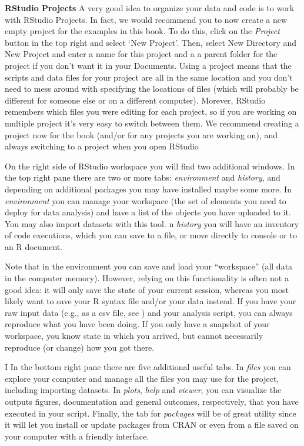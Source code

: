 \begin{feature}
  \textbf{RStudio Projects}
  A very good idea to organize your data and code is to work with RStudio Projects.
  In fact, we would recommend you to now create a new empty project for the examples in this book.
  To do this, click on the \emph{Project} button in the top right and select `New Project'.
  Then, select New Directory and New Project and enter a name for this project
  and a a parent folder for the project if you don't want it in your Documents. 
  Using a project means that the scripts and data files for your project are all in the same location
  and you don't need to mess around with specifying the locations of files
  (which will probably be different for someone else or on a different computer).
  Morever, RStudio remembers which files you were editing for each project,
  so if you are working on multiple project it's very easy to switch between them.
  We recommend creating a project now for the book (and/or for any projects you are working on),
  and always switching to a project when you open RStudio
\end{feature}


On the right side of RStudio workspace you will find two additional
windows. In the top right pane there are two or more tabs:
\emph{environment} and \emph{history}, and depending on additional
packages you may have installed maybe some more.  In
\emph{environment} you can manage your workspace (the set of elements
you need to deploy for data analysis) and have a list of the objects
you have uploaded to it. You may also import datasets with this tool.
n \emph{history} you will
have an inventory of code executions, which you can save to a file, or
move directly to console or to an R document.

Note that in the environment you can save and load your ``workspace'' (all data in the computer memory).
However, relying on this functionality is often not a good idea: it
will only save the state of your current session, whereas you most
likely want to save your R syntax file and/or your data instead.
If you have your raw input data (e.g., as a csv file, see )
and your analysis script, you can always
reproduce what you have been doing. If you only have a snapshot of
your workspace, you know state in which you arrived, but cannot
necessarily reproduce (or change) how you got there.

I In the bottom right pane
there are five additional useful tabs.
In \emph{files} you can explore
your computer and manage all the files you may use for the project,
including importing datasets. In \emph{plots}, \emph{help} and
\emph{viewer}, you can visualize the outputs figures, documentation
and general outcomes, respectively, that you have executed in your
script. Finally, the tab for \emph{packages} will be of great
utility since it will let you install or update packages from CRAN or
even from a file saved on your computer with a friendly interface.

